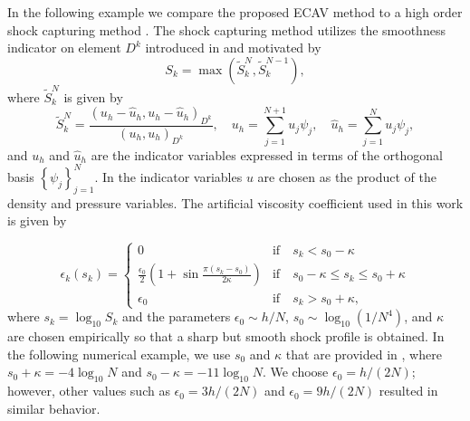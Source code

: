 \documentclass{elsarticle}
\theoremstyle{definition}
\theoremstyle{plain}
\theoremstyle{plain}
\renewcommand{\hat}[1]{\widehat{#1}}
\newcommand{\LRp}[1]{\left( #1 \right)} %
\newcommand{\reftwo}[1]{{\color{blue}#1}}
\renewcommand{\reftwo}[1]{#1}
\begin{document}
In the following example we compare the proposed ECAV method to a high order shock capturing method \cite{persson2006sub}. The shock capturing method utilizes the smoothness indicator on element $D^k$ introduced in \cite{hennemann2021provably} and motivated by \cite{klockner2011viscous} 
\begin{equation}\label{eq:smoothness indicator}
    S_k = \max{\left(\tilde{S}^N_k,\tilde{S}^{N-1}_k\right)}, 
\end{equation}
where $\tilde{S}^N_k$ is given by
\begin{equation}\label{eq:smoothness indicator arguments}
\tilde{S}^N_k = \frac{\LRp{u_h - \hat{u}_h,u_h-\hat{u}_h}_{D^k}}{\LRp{u_h,u_h}_{D^k}}, \quad u_h = \reftwo{\sum_{j=1}^{N+1}} u_j \psi_j, \quad \hat{u}_h = \reftwo{\sum_{j=1}^{N}} u_j \psi_j,
\end{equation}
and $u_h$ and $\hat{u}_h$ are the indicator variables expressed in terms of the orthogonal basis $\left\{\psi_j \right\}_{j=1}^N$. In \cite{hennemann2021provably} the indicator variables $u$ are chosen as the product of the density and pressure variables. \reftwo{The artificial viscosity coefficient used in this work is given by}

\begin{equation}\label{eq:ramp}
    \epsilon_k(s_k) = 
    \begin{cases}
        0 & \text{if} \quad  s_k < s_0 - \kappa\\
        \frac{\epsilon_0}{2} \LRp{1 + \sin{\frac{\pi(s_k - s_0)}{2 \kappa}}} & \text{if} \quad s_0 - \kappa \leq s_k \leq s_0 + \kappa\\
        \epsilon_0 & \text{if} \quad s_k > s_0 + \kappa,
    \end{cases}
\end{equation}
where $s_k = \log_{10}S_k$ and the parameters $\epsilon_0 \sim h/N$, $s_0 \sim \log_{10}(1/N^4)$, and $\kappa$ are chosen empirically so that a sharp but smooth shock profile is obtained. In the following numerical example, we use $s_0$ and $\kappa$ that are provided in \cite{PGSH2020}, where $s_0 + \kappa = -4\log_{10}{N}$ and $s_0 - \kappa = -11\log_{10}{N}$. We choose $\epsilon_0 = h/(2N)$; however, other values such as $\epsilon_0 = 3h/(2N)$ and $\epsilon_0 = 9h/(2N)$ resulted in similar behavior. 
\end{document}
